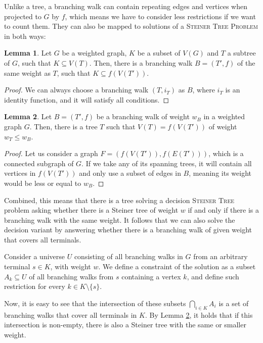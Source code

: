 \documentclass[thesis=M,english,hidelinks]{FITthesis}[2012/10/20]
\theoremstyle{definition}
\newtheorem{lemma}{Lemma}
\begin{document}
Unlike a tree, a branching walk can contain repeating edges and vertices when projected to $G$ by $f$, which means we
have to consider less restrictions if we want to count them. They can also be mapped to solutions of a \textsc{Steiner
Tree Problem} in both ways:

\begin{lemma}
    Let $G$ be a weighted graph, $K$ be a subset of $V(G)$ and $T$ a subtree of $G$, such that $K \subseteq V(T)$. Then,
    there is a branching walk $B = (T', f)$ of the same weight as $T$, such that $K \subseteq f(V(T'))$.
\end{lemma}

\begin{proof}
    We can always choose a branching walk $(T, i_T)$ as $B$, where $i_T$ is an identity function, and it will satisfy all
    conditions.
\end{proof}

\begin{lemma}
    \label{ned:branchtotree}
    Let $B = (T', f)$ be a branching walk of weight $w_B$ in a weighted graph $G$. Then, there is a tree $T$ such that
    $V(T) = f(V(T'))$ of weight $w_T \leq w_B$.
\end{lemma}

\begin{proof}
    Let us consider a graph $F = \left( f(V(T')), f(E(T')) \right)$, which is a connected subgraph of $G$. If we take
    any of its spanning trees, it will contain all vertices in $f(V(T'))$ and only use a subset of edges in $B$, meaning
    its weight would be less or equal to $w_B$.
\end{proof}

Combined, this means that there is a tree solving a decision \textsc{Steiner Tree} problem asking whether there is a
Steiner tree of weight $w$ if and only if there is a branching walk with the same weight. It follows that we can also
solve the decision variant by answering whether there is a branching walk of given weight that covers all terminals.

Consider a universe $U$ consisting of all branching walks in $G$ from an arbitrary terminal $s \in K$, with weight $w$.
We define a constraint of the solution as a subset $A_k \subseteq U$ of all branching walks from $s$ containing a vertex
$k$, and define such restriction for every $k \in K \setminus \{s\}$.

Now, it is easy to see that the intersection of these subsets $\bigcap_{i \in K} A_i$ is a set of branching walks that
cover all terminals in $K$. By Lemma \ref{ned:branchtotree}, it holds that if this intersection is non-empty, there is also
a Steiner tree with the same or smaller weight.
\end{document}
